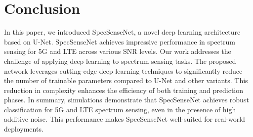 \documentclass[journal]{IEEEtran} %
\begin{document}
\section{Conclusion}
In this paper, we introduced SpecSenseNet, a novel deep learning architecture based on U-Net. SpecSenseNet achieves impressive performance in spectrum sensing for 5G and LTE across various SNR levels.  Our work addresses the challenge of applying deep learning to spectrum sensing tasks. The proposed network leverages cutting-edge deep learning techniques to significantly reduce the number of trainable parameters compared to U-Net and other variants. This reduction in complexity enhances the efficiency of both training and prediction phases. In summary, simulations demonstrate that SpecSenseNet achieves robust classification for 5G and LTE spectrum sensing, even in the presence of high additive noise. This performance makes SpecSenseNet well-suited for real-world deployments.



\end{document}

